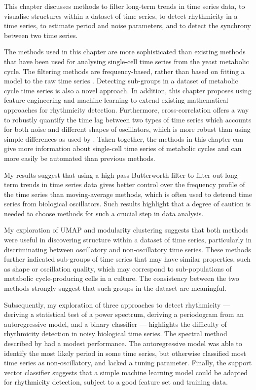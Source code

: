 This chapter discusses methods to filter long-term trends in time series data, to visualise structures within a dataset of time series, to detect rhythmicity in a time series, to estimate period and noise parameters, and to detect the synchrony between two time series.

The methods used in this chapter are more sophisticated than existing methods that have been used for analysing single-cell time series from the yeast metabolic cycle.
The filtering methods are frequency-based, rather than based on fitting a model to the raw time series \parencite{baumgartnerFlavinbasedMetabolicCycles2018,ozsezenInferenceHighLevelInteraction2019}.
Detecting sub-groups in a dataset of metabolic cycle time series is also a novel approach.
In addition, this chapter proposes using feature engineering and machine learning to extend existing mathematical approaches for rhythmicity detection.
Furthermore, cross-correlation offers a way to robustly quantify the time lag between two types of time series which accounts for both noise and different shapes of oscillators, which is more robust than using simple differences as used by \textcite{baumgartnerFlavinbasedMetabolicCycles2018}.
Taken together, the methods in this chapter can give more information about single-cell time series of metabolic cycles and can more easily be automated than previous methods.

My results suggest that using a high-pass Butterworth filter to filter out long-term trends in time series data gives better control over the frequency profile of the time series than moving-average methods, which is often used to detrend time series from biological oscillators.
Such results highlight that a degree of caution is needed to choose methods for such a crucial step in data analysis.

My exploration of UMAP and modularity clustering suggests that both methods were useful in discovering structure within a dataset of time series, particularly in discriminating between oscillatory and non-oscillatory time series.
These methods further indicated sub-groups of time series that may have similar properties, such as shape or oscillation quality, which may correspond to sub-populations of metabolic cycle-producing cells in a culture.
The consistency between the two methods strongly suggest that such groups in the dataset are meaningful.

Subsequently, my exploration of three approaches to detect rhythmicity --- deriving a statistical test of a power spectrum, deriving a periodogram from an autoregressive model, and a binary classifier --- highlights the difficulty of rhythmicity detection in noisy biological time series.
The spectral method described by \textcite{glynnDetectingPeriodicPatterns2006} had a modest performance.
The autoregressive model was able to identify the most likely period in some time series, but otherwise classified most time series as non-oscillatory, and lacked a tuning parameter.
Finally, the support vector classifier suggests that a simple machine learning model could be adapted for rhythmicity detection, subject to a good feature set and training data.


